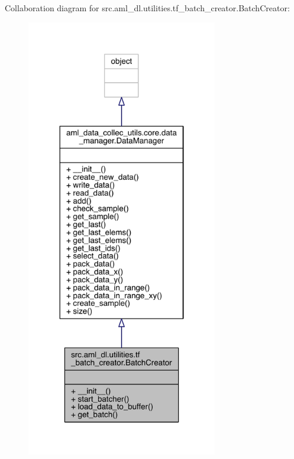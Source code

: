 Collaboration diagram for src.\+aml\+\_\+dl.\+utilities.\+tf\+\_\+batch\+\_\+creator.\+Batch\+Creator\+:
\nopagebreak
\begin{figure}[H]
\begin{center}
\leavevmode
\includegraphics[width=236pt]{classsrc_1_1aml__dl_1_1utilities_1_1tf__batch__creator_1_1_batch_creator__coll__graph}
\end{center}
\end{figure}
